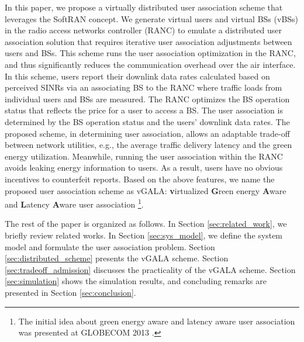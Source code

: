 \documentclass[journal]{IEEEtran}
\theoremstyle{definition}
\begin{document}
In this paper, we propose a virtually distributed user association scheme that leverages the SoftRAN concept. We generate virtual users and virtual BSs (vBSs) in the radio access networks controller (RANC) to emulate a distributed user association solution that requires iterative user association adjustments between users and BSs. This scheme runs the user association optimization in the RANC, and thus significantly reduces the communication overhead over the air interface. In this scheme, users report their downlink data rates calculated based on perceived SINRs via an associating BS to the RANC where traffic loads from individual users and BSs are measured. The RANC optimizes the BS operation status that reflects the price for a user to access a BS. The user association is determined by the BS operation status and the users' downlink data rates. The proposed scheme, in determining user association, allows an adaptable trade-off between network utilities, e.g., the average traffic delivery latency and the green energy utilization. Meanwhile, running the user association within the RANC avoids leaking energy information to users. As a result, users have no obvious incentives to counterfeit reports. Based on the above features, we name the proposed user association scheme as vGALA: \textbf{v}irtualized \textbf{G}reen energy \textbf{A}ware and \textbf{L}atency \textbf{A}ware user association \footnote{The initial idea about green energy aware and latency aware user association was presented at GLOBECOM 2013 \cite{Han:2013:GALA}.}.

The rest of the paper is organized as follows. In Section \ref{sec:related_work}, we briefly review related works. In Section \ref{sec:sys_model}, we define the system model and formulate the user association problem. Section \ref{sec:distributed_scheme} presents the vGALA scheme. Section \ref{sec:tradeoff_admission} discusses the practicality of the vGALA scheme. Section \ref{sec:simulation} shows the simulation results, and concluding remarks are presented in Section \ref{sec:conclusion}.
\end{document}
